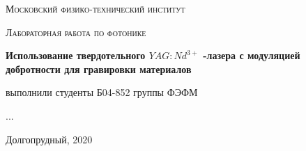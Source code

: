 \documentclass[a4paper]{article}
\begin{document}
\graphicspath{ {pictures/} }

\begin{titlepage}
	\centering
	\vspace{5cm}
    {\scshape\LARGE Московский физико-технический институт\par}
	\vspace{5cm}
	{\scshape\Large Лабораторная работа по фотонике \par}
	\vspace{1cm}
    {\huge\bfseries  Использование твердотельного $YAG:Nd^{3+}$ -лазера с модуляцией добротности для гравировки материалов\par}
	\vspace{1cm}
	\vfill
    \begin{flushright}
        {\large выполнили студенты Б04-852 группы ФЭФМ}\par
        \vspace{0.3cm}
        {\LARGE ...}
    \end{flushright}
	\vfill
Долгопрудный, 2020
\end{titlepage}

\pagestyle{fancy} 
\fancyhead[C]{}
\fancyfoot[C]{ \noindent\rule{\textwidth}{0.4pt} \thepage }


\newpage
\end{document}
